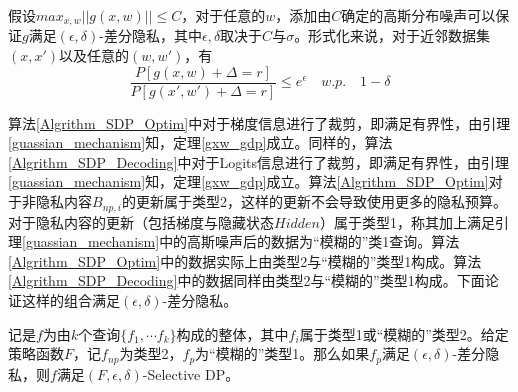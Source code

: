 \begin{theorem}
	\label{gxw_gdp}
	假设$max_{x,w}||g(x,w)||\leq C$，对于任意的$w$，添加由$C$确定的高斯分布噪声可以保证$g$满足$(\epsilon, \delta)$-差分隐私，其中$\epsilon, \delta$取决于$C$与$\sigma$。形式化来说，对于近邻数据集$(x, x')$以及任意的$(w, w')$，有
	$$\frac{P[g(x,w) + \Delta = r]}{P[g(x',w') + \Delta = r]}\leq e^\epsilon \quad w.p.\quad1-\delta$$
\end{theorem}

算法\ref{Algrithm_SDP_Optim}中对于梯度信息进行了裁剪，即满足有界性，由引理\ref{guassian_mechanism}知，定理\ref{gxw_gdp}成立。同样的，算法\ref{Algrithm_SDP_Decoding}中对于Logits信息进行了裁剪，即满足有界性，由引理\ref{guassian_mechanism}知，定理\ref{gxw_gdp}成立。算法\ref{Algrithm_SDP_Optim}对于非隐私内容$B_{np,i}$的更新属于类型2，这样的更新不会导致使用更多的隐私预算。对于隐私内容的更新（包括梯度与隐藏状态$Hidden$）属于类型1，称其加上满足引理\ref{guassian_mechanism}中的高斯噪声后的数据为“模糊的”类1查询。算法\ref{Algrithm_SDP_Optim}中的数据实际上由类型2与“模糊的”类型1构成。算法\ref{Algrithm_SDP_Decoding}中的数据同样由类型2与“模糊的”类型1构成。下面论证这样的组合满足$(\epsilon, \delta)$-差分隐私。

\begin{theorem}
	\label{gxw_gdp}
	记是$f$为由$k$个查询$\{f_1,\cdots f_k\}$构成的整体，其中$f_i$属于类型1或“模糊的”类型2。给定策略函数$F$，记$f_{np}$为类型2，$f_p$为“模糊的”类型1。那么如果$f_p$满足$(\epsilon, \delta)$-差分隐私，则$f$满足$(F,ϵ,δ)$-Selective DP。
\end{theorem}



